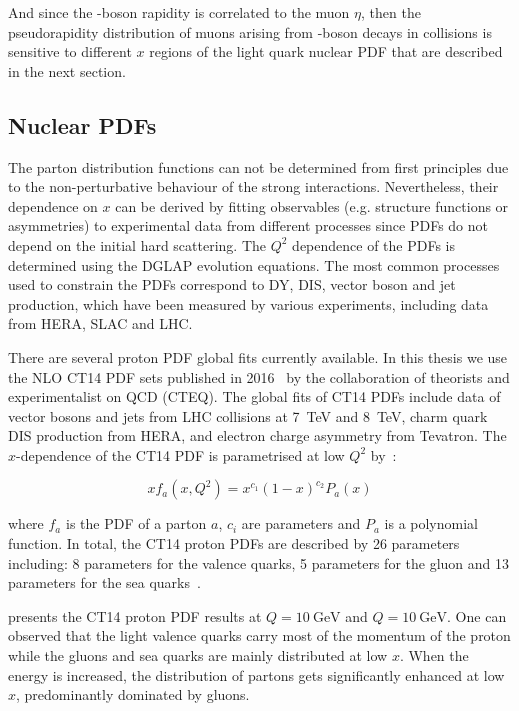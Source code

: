 And since the \Wb-boson rapidity is correlated to the muon $\eta$, then the pseudorapidity distribution of muons arising from \Wb-boson decays in \RunpPb collisions is sensitive to different $x$ regions of the light quark nuclear PDF that are described in the next section.


\subsection{Nuclear PDFs}\label{sec:WBoson_Introduction_nPDFs}

The parton distribution functions can not be determined from first principles due to the non-perturbative behaviour of the strong interactions. Nevertheless, their dependence on $x$ can be derived by fitting observables (e.g. structure functions or asymmetries) to experimental data from different processes since PDFs do not depend on the initial hard scattering. The $Q^{2}$ dependence of the PDFs is determined using the DGLAP evolution equations. The most common processes used to constrain the PDFs correspond to DY, DIS, vector boson and jet production, which have been measured by various experiments, including data from HERA, SLAC and LHC.

There are several proton PDF global fits currently available. In this thesis we use the NLO CT14 PDF sets published in 2016~\cite{CT14} by the collaboration of theorists and experimentalist on QCD (CTEQ). The global fits of CT14 PDFs include data of vector bosons and jets from LHC \Runpp collisions at \SI{7}{\TeV} and \SI{8}{\TeV}, charm quark DIS production from HERA, and electron charge asymmetry from Tevatron. The $x$-dependence of the CT14 PDF is parametrised at low $Q^{2}$ by~\cite{CT14}:

\begin{equation}
 xf_{a}\left(x, Q^{2}\right) = x^{c_{1}}\left(1-x\right)^{c_{2}}{P_{a}\left(x\right)}
\end{equation}

where $f_{a}$ is the PDF of a parton $a$, $c_{i}$ are parameters and $P_{a}$ is a polynomial function. In total, the CT14 proton PDFs are described by 26 parameters including: 8 parameters for the valence quarks, 5 parameters for the gluon and 13 parameters for the sea quarks~\cite{CT14}.

 presents the CT14 proton PDF results at $Q = \SI{10}{\GeV}$ and $Q = \SI{10}{\GeV}$. One can observed that the light valence quarks carry most of the momentum of the proton while the gluons and sea quarks are mainly distributed at low $x$. When the energy is increased, the distribution of partons gets significantly enhanced at low $x$, predominantly dominated by gluons.

